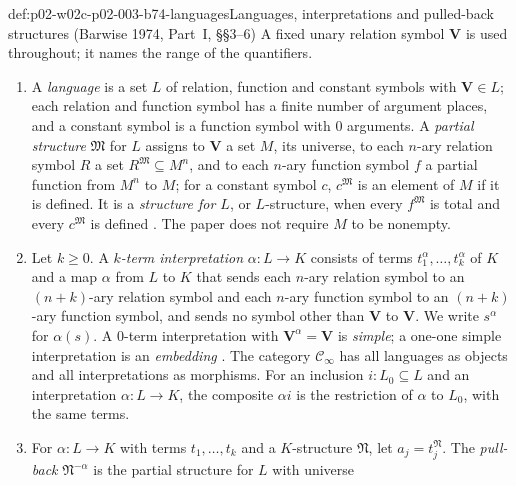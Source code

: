 \begin{hbdefinition}{def:p02-w02c-p02-003-b74-languages}{Languages, interpretations and pulled-back structures (Barwise 1974, Part~I, \S\S3--6)}
A fixed unary relation symbol \(\mathbf V\) is used throughout; it names the
range of the quantifiers.
\begin{enumerate}
\item A \emph{language} is a set \(L\) of relation, function and constant
      symbols with \(\mathbf V\in L\); each relation and function symbol has
      a finite number of argument places, and a constant symbol is a function
      symbol with \(0\) arguments.  A \emph{partial structure}
      \(\mathfrak M\) for \(L\) assigns to \(\mathbf V\) a set \(M\), its
      universe, to each \(n\)-ary relation symbol \(R\) a set
      \(R^{\mathfrak M}\subseteq M^{n}\), and to each \(n\)-ary function
      symbol \(f\) a partial function from \(M^{n}\) to \(M\); for a constant
      symbol \(c\), \(c^{\mathfrak M}\) is an element of \(M\) if it is
      defined.  It is a \emph{structure for \(L\)}, or \(L\)-structure, when
      every \(f^{\mathfrak M}\) is total and every \(c^{\mathfrak M}\) is
      defined \cite[Part~I, \S3, p.~228]{Barwise1974Axioms}.  The paper does
      not require \(M\) to be nonempty.
\item Let \(k\geq0\).  A \emph{\(k\)-term interpretation}
      \(\alpha:L\to K\) consists of terms \(t_1^{\alpha},\ldots,t_k^{\alpha}\)
      of \(K\) and a map \(\alpha\) from \(L\) to \(K\) that sends each
      \(n\)-ary relation symbol to an \((n+k)\)-ary relation symbol and each
      \(n\)-ary function symbol to an \((n+k)\)-ary function symbol, and
      sends no symbol other than \(\mathbf V\) to \(\mathbf V\).  We write
      \(s^{\alpha}\) for \(\alpha(s)\).  A \(0\)-term interpretation with
      \(\mathbf V^{\alpha}=\mathbf V\) is \emph{simple}; a one-one simple
      interpretation is an \emph{embedding} \cite[Part~I, \S4, 4.1--4.2,
      pp.~229--231]{Barwise1974Axioms}.  The category \(\mathcal C_\infty\)
      has all languages as objects and all interpretations as morphisms.
      For an inclusion \(i:L_0\subseteq L\) and an interpretation
      \(\alpha:L\to K\), the composite \(\alpha i\) is the restriction of
      \(\alpha\) to \(L_0\), with the same terms.
\item For \(\alpha:L\to K\) with terms \(t_1,\ldots,t_k\) and a
      \(K\)-structure \(\mathfrak N\), let \(a_j=t_j^{\mathfrak N}\).  The
      \emph{pull-back} \(\mathfrak N^{-\alpha}\) is the partial structure for
      \(L\) with universe

\end{enumerate}
\end{hbdefinition}
